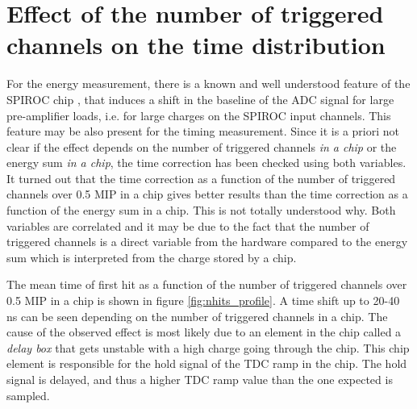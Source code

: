 \section{Effect of the number of triggered channels on the time distribution}
\label{subsec:ped_shift}

For the energy measurement, there is a known and well understood feature of the SPIROC chip \cite{Hartbrich2012}, that induces a shift in the baseline of the ADC signal for large pre-amplifier loads, i.e. for large charges on the SPIROC input channels. This feature may be also present for the timing measurement. Since it is a priori not clear if the effect depends on the number of triggered channels \textit{in a chip} or the energy sum \textit{in a chip}, the time correction has been checked using both variables. It turned out that the time correction as a function of the number of triggered channels over 0.5 MIP in a chip gives better results than the time correction as a function of the energy sum in a chip. This is not totally understood why. Both variables are correlated and it may be due to the fact that the number of triggered channels is a direct variable from the hardware compared to the energy sum which is interpreted from the charge stored by a chip.%

The mean time of first hit as a function of the number of triggered channels over 0.5 MIP in a chip is shown in figure \ref{fig:nhits_profile}. A time shift up to 20-40 ns can be seen depending on the number of triggered channels in a chip. The cause of the observed effect is most likely due to an element in the chip called a \textit{delay box} that gets unstable with a high charge going through the chip. This chip element is responsible for the hold signal of the TDC ramp in the chip. The hold signal is delayed, and thus a higher TDC ramp value than the one expected is sampled.

